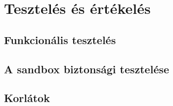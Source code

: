 \chapter{Tesztelés és értékelés}
\label{ch:teszteles}

\section{Funkcionális tesztelés}

\section{A sandbox biztonsági tesztelése}

\section{Korlátok}
